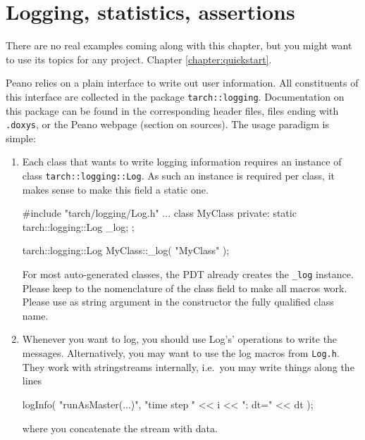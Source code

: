 \section{Logging, statistics, assertions}
\label{section:logging}



\chapterDescription
  {
    There are no real examples coming along with this chapter, but you might
    want to use its topics for any project.
  }
  {
    Chapter \ref{chapter:quickstart}.
  }





Peano relies on a plain interface to write out user information. 
All constituents of this interface are collected in the package
\texttt{tarch::logging}.
Documentation on this package can be found in the corresponding header files,
files ending with \texttt{.doxys}, or the Peano webpage (section on sources).
The usage paradigm is simple:

\begin{enumerate}
  \item Each class that wants to write logging information requires an instance
  of class \texttt{tarch::logging::Log}. As such an instance is required per
  class, it makes sense to make this field a static one.
  \begin{code}
  #include "tarch/logging/Log.h"
  ...
  class MyClass {
    private:
      static tarch::logging::Log  _log;
  };
  
  tarch::logging::Log  MyClass::_log( "MyClass" );
  \end{code}
  For most auto-generated classes, the PDT already creates the \texttt{\_log}
  instance. Please keep to the nomenclature of the class field to make all
  macros work. Please use as string argument in the constructor the fully
  qualified class name.
  \item Whenever you want to log, you should use Log's' operations to write the
  messages. Alternatively, you may want to use the log macros from
  \texttt{Log.h}. They work with stringstreams internally, i.e.~you may write
  things along the lines
  \begin{code}
logInfo( "runAsMaster(...)", "time step " << i << ": dt=" << dt );
  \end{code}
  where you concatenate the stream with data.
\end{enumerate}

